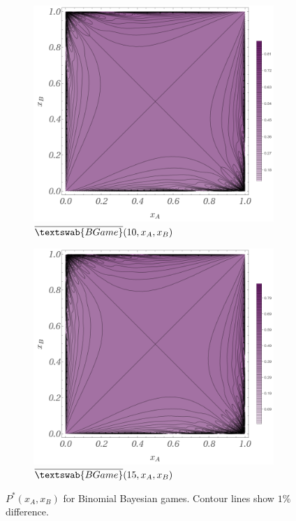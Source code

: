 \documentclass{article}
\theoremstyle{definition}
\newcommand{\InfBG}[1]{$\overline{\textswab{BGame}}(#1)$}
\begin{document}
\begin{figure}[H]
    \centering
    \begin{subfigure}[b]{0.4\textwidth}
        \includegraphics[width=\textwidth]{img/BinomialBayesian_10.png}
        \caption{\InfBG{10,x_A,x_B}}
        \label{fig:PBG_10}
    \end{subfigure}
    \hspace{0.05\textwidth} %
    \begin{subfigure}[b]{0.4\textwidth}
        \includegraphics[width=\textwidth]{img/BinomialBayesian_15.png}
        \caption{\InfBG{15,x_A,x_B}}
        \label{fig:PBG_15}
    \end{subfigure}
    
    \caption{$P^*(x_A,x_B)$ for Binomial Bayesian games. Contour lines show $1\%$ difference.}
    \label{fig:P_InfBG_10_15}
\end{figure}
\end{document}
